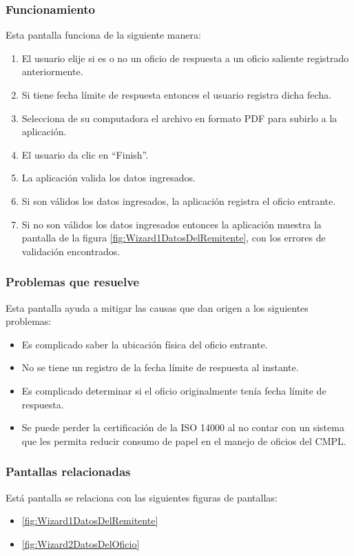 \subsubsection{Funcionamiento}
	Esta pantalla funciona de la siguiente manera:
	
	\begin{enumerate}
		\item El usuario elije si es o no un oficio de respuesta a un oficio saliente registrado anteriormente.
		\item Si tiene fecha límite de respuesta entonces el usuario registra dicha fecha.
		\item Selecciona de su computadora el archivo en formato PDF para subirlo a la aplicación.
		\item El usuario da clic en ``Finish''.
		\item La aplicación valida los datos ingresados.
		\item Si son válidos los datos ingresados, la aplicación registra el oficio entrante.
		\item Si no son válidos los datos ingresados entonces la aplicación muestra la pantalla de la figura \ref{fig:Wizard1DatosDelRemitente}, con los errores de validación encontrados.
	\end{enumerate}

\subsubsection{Problemas que resuelve}
Esta pantalla ayuda a mitigar las causas que dan origen a los siguientes problemas:

	\begin{itemize}
		\item Es complicado saber la ubicación física del oficio entrante.
		\item No se tiene un registro de la fecha límite de respuesta al instante.
		\item Es complicado determinar si el oficio originalmente tenía fecha límite de respuesta.
		\item Se puede perder la certificación de la ISO 14000 al no contar con un sistema que les permita reducir consumo de papel en el manejo de oficios del CMPL.
	\end{itemize}

\subsubsection{Pantallas relacionadas}
Está pantalla se relaciona con las siguientes figuras de pantallas:
	\begin{itemize}
		\item \ref{fig:Wizard1DatosDelRemitente}
		\item \ref{fig:Wizard2DatosDelOficio}
	\end{itemize}

